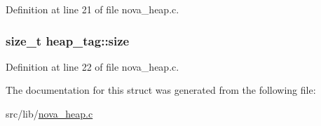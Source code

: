 Definition at line 21 of file nova\-\_\-heap.\-c.

\hypertarget{structheap__tag_aa492677962c3d48df0880c9dacea3564}{
\subsubsection[{size}]{\setlength{\rightskip}{0pt plus 5cm}size\-\_\-t heap\-\_\-tag\-::size}}\label{structheap__tag_aa492677962c3d48df0880c9dacea3564}


Definition at line 22 of file nova\-\_\-heap.\-c.



The documentation for this struct was generated from the following file\-:\begin{DoxyCompactItemize}
\item 
src/lib/\hyperlink{nova__heap_8c}{nova\-\_\-heap.\-c}\end{DoxyCompactItemize}
